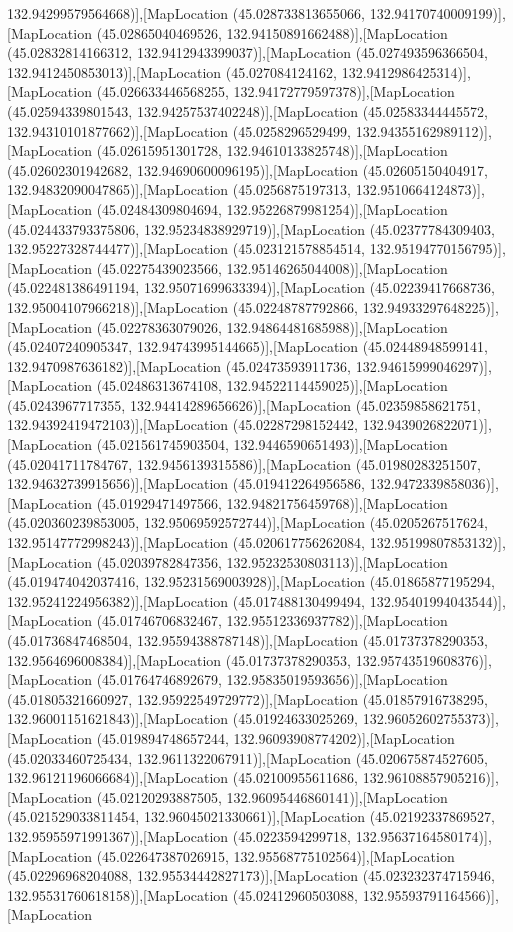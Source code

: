 132.94299579564668)],[MapLocation (45.028733813655066, 132.94170740009199)],[MapLocation (45.02865040469526, 132.94150891662488)],[MapLocation (45.02832814166312, 132.9412943399037)],[MapLocation (45.027493596366504, 132.9412450853013)],[MapLocation (45.027084124162, 132.9412986425314)],[MapLocation (45.026633446568255, 132.94172779597378)],[MapLocation (45.02594339801543, 132.94257537402248)],[MapLocation (45.02583344445572, 132.94310101877662)],[MapLocation (45.0258296529499, 132.94355162989112)],[MapLocation (45.02615951301728, 132.94610133825748)],[MapLocation (45.02602301942682, 132.94690600096195)],[MapLocation (45.02605150404917, 132.94832090047865)],[MapLocation (45.0256875197313, 132.9510664124873)],[MapLocation (45.02484309804694, 132.95226879981254)],[MapLocation (45.024433793375806, 132.95234838929719)],[MapLocation (45.02377784309403, 132.95227328744477)],[MapLocation (45.023121578854514, 132.95194770156795)],[MapLocation (45.02275439023566, 132.95146265044008)],[MapLocation (45.022481386491194, 132.95071699633394)],[MapLocation (45.02239417668736, 132.95004107966218)],[MapLocation (45.02248787792866, 132.94933297648225)],[MapLocation (45.02278363079026, 132.94864481685988)],[MapLocation (45.02407240905347, 132.94743995144665)],[MapLocation (45.02448948599141, 132.9470987636182)],[MapLocation (45.02473593911736, 132.94615999046297)],[MapLocation (45.02486313674108, 132.94522114459025)],[MapLocation (45.0243967717355, 132.94414289656626)],[MapLocation (45.02359858621751, 132.94392419472103)],[MapLocation (45.02287298152442, 132.9439026822071)],[MapLocation (45.021561745903504, 132.9446590651493)],[MapLocation (45.02041711784767, 132.9456139315586)],[MapLocation (45.01980283251507, 132.94632739915656)],[MapLocation (45.019412264956586, 132.9472339858036)],[MapLocation (45.01929471497566, 132.94821756459768)],[MapLocation (45.020360239853005, 132.95069592572744)],[MapLocation (45.0205267517624, 132.95147772998243)],[MapLocation (45.020617756262084, 132.95199807853132)],[MapLocation (45.02039782847356, 132.95232530803113)],[MapLocation (45.019474042037416, 132.95231569003928)],[MapLocation (45.01865877195294, 132.95241224956382)],[MapLocation (45.017488130499494, 132.95401994043544)],[MapLocation (45.01746706832467, 132.95512336937782)],[MapLocation (45.01736847468504, 132.95594388787148)],[MapLocation (45.01737378290353, 132.9564696008384)],[MapLocation (45.01737378290353, 132.95743519608376)],[MapLocation (45.01764746892679, 132.95835019593656)],[MapLocation (45.01805321660927, 132.95922549729772)],[MapLocation (45.01857916738295, 132.96001151621843)],[MapLocation (45.01924633025269, 132.96052602755373)],[MapLocation (45.019894748657244, 132.96093908774202)],[MapLocation (45.02033460725434, 132.9611322067911)],[MapLocation (45.020675874527605, 132.96121196066684)],[MapLocation (45.02100955611686, 132.96108857905216)],[MapLocation (45.02120293887505, 132.96095446860141)],[MapLocation (45.021529033811454, 132.96045021330661)],[MapLocation (45.02192337869527, 132.95955971991367)],[MapLocation (45.0223594299718, 132.95637164580174)],[MapLocation (45.022647387026915, 132.95568775102564)],[MapLocation (45.02296968204088, 132.95534442827173)],[MapLocation (45.023232374715946, 132.95531760618158)],[MapLocation (45.02412960503088, 132.95593791164566)],[MapLocation 